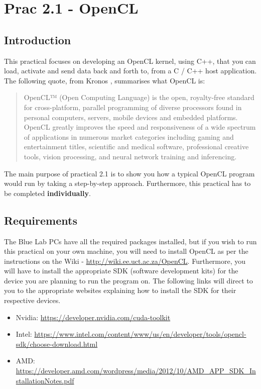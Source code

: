 \newpage
\section{Prac 2.1 - OpenCL}
\label{sec:Prac2}

\subsection{Introduction}

This practical focuses on  developing an OpenCL kernel, using C++, that you can load, activate and send data back and forth to, from a C / C++ host application. The following quote, from Kronos \cite{opencl_khronos}, summarises what  OpenCL is:

\begin{quote}
    OpenCL™ (Open Computing Language) is the open, royalty-free standard for cross-platform, parallel programming of diverse processors found in personal computers, servers, mobile devices and embedded platforms. OpenCL greatly improves the speed and responsiveness of a wide spectrum of applications in numerous market categories including gaming and entertainment titles, scientific and medical software, professional creative tools, vision processing, and neural network training and inferencing. \cite{opencl_khronos}
\end{quote}

The main purpose of practical 2.1 is to show you how a typical OpenCL program would run by taking a step-by-step approach. Furthermore, this practical has to be completed \textbf{individually}.

\subsection{Requirements}
The Blue Lab PCs have all the required packages installed, but if you wish to run this practical on your own machine, you will need to install OpenCL as per the instructions on the Wiki - \href{http://wiki.ee.uct.ac.za/OpenCL}{http://wiki.ee.uct.ac.za/OpenCL}. Furthermore, you will have to install the appropriate SDK (software development kits) for the device you are planning to run the program on. The following links will direct to you to the appropriate websites explaining how to install the SDK for their respective devices.
\begin{itemize}
    \item Nvidia: \href{https://developer.nvidia.com/cuda-toolkit}{https://developer.nvidia.com/cuda-toolkit}
    \item Intel: \href{https://www.intel.com/content/www/us/en/developer/tools/opencl-sdk/choose-download.html}{https://www.intel.com/content/www/us/en/developer/tools/opencl-sdk/choose-download.html}
    \item AMD: \href{https://developer.amd.com/wordpress/media/2012/10/AMD_APP_SDK_InstallationNotes.pdf}{https://developer.amd.com/wordpress/media/2012/10/AMD_APP_SDK_InstallationNotes.pdf}
\end{itemize}


